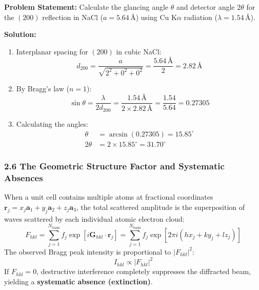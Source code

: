 \documentclass[11pt,a4paper]{article}
\begin{document}
\begin{solbox}
\textbf{Problem Statement:} Calculate the glancing angle $\theta$ and detector angle $2\theta$ for the $(200)$ reflection in NaCl ($a = 5.64\,\text{\AA}$) using Cu K$\alpha$ radiation ($\lambda = 1.54\,\text{\AA}$).

\textbf{Solution:}
\begin{enumerate}
    \item Interplanar spacing for $(200)$ in cubic NaCl:
    \begin{equation}
    d_{200} = \frac{a}{\sqrt{2^2 + 0^2 + 0^2}} = \frac{5.64\,\text{\AA}}{2} = 2.82\,\text{\AA}
    \end{equation}
    \item By Bragg's law ($n=1$):
    \begin{equation}
    \sin\theta = \frac{\lambda}{2d_{200}} = \frac{1.54\,\text{\AA}}{2 \times 2.82\,\text{\AA}} = \frac{1.54}{5.64} = 0.27305
    \end{equation}
    \item Calculating the angles:
    \begin{align}
    \theta &= \arcsin(0.27305) = \mathbf{15.85^\circ} \\
    2\theta &= 2 \times 15.85^\circ = \mathbf{31.70^\circ}
    \end{align}
\end{enumerate}
\end{solbox}

\subsubsection{2.6 The Geometric Structure Factor and Systematic Absences}
When a unit cell contains multiple atoms at fractional coordinates $\mathbf{r}_j = x_j\mathbf{a}_1 + y_j\mathbf{a}_2 + z_j\mathbf{a}_3$, the total scattered amplitude is the superposition of waves scattered by each individual atomic electron cloud:
\begin{equation}
F_{hkl} = \sum_{j=1}^{N_{\text{basis}}} f_j \exp\left[i\mathbf{G}_{hkl}\cdot\mathbf{r}_j\right] = \sum_{j=1}^{N_{\text{basis}}} f_j \exp\left[2\pi i(hx_j + ky_j + lz_j)\right]
\end{equation}
The observed Bragg peak intensity is proportional to $|F_{hkl}|^2$:
\begin{equation}
I_{hkl} \propto |F_{hkl}|^2
\end{equation}
If $F_{hkl} = 0$, destructive interference completely suppresses the diffracted beam, yielding a \textbf{systematic absence (extinction)}.
\end{document}

